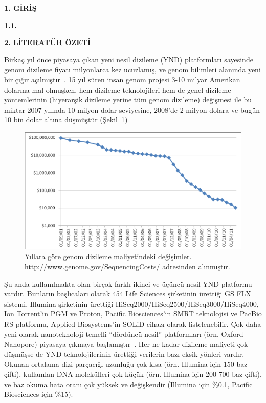 \documentclass[11pt]{article}
\begin{document}
\newpage
\begin{center}
{\bf \Large 1. GİRİŞ}
\end{center}

\bigskip
\noindent
{\bf \large 1.1. }

\noindent

\begin{center}
{\bf \Large 2. LİTERATÜR ÖZETİ}
\end{center}

Birkaç yıl önce piyasaya çıkan yeni nesil dizileme (YND) platformları sayesinde genom dizileme fiyatı milyonlarca kez ucuzlamış, ve genom bilimleri alanında yeni bir çığır açılmıştır~\cite{Mardis2008}. 15 yıl süren insan genom projesi 3-10 milyar Amerikan dolarına mal olmuşken, hem dizileme teknolojileri hem de genel dizileme yöntemlerinin (hiyerarşik dizileme yerine tüm genom dizileme) değişmesi ile bu miktar 2007 yılında 10 milyon dolar seviyesine, 2008'de 2 milyon dolara ve bugün 10 bin dolar altına düşmüştür (Şekil~\ref{fig:cost})

\begin{figure}[htb]
\begin{center}
  \includegraphics[scale=0.75]{cost.png}
\end{center}
\caption{Yıllara göre genom dizileme maliyetindeki değişimler. http://www.genome.gov/SequencingCosts/ adresinden alınmıştır.}
\label{fig:cost}
\end{figure}


Şu anda kullanılmakta olan birçok farklı ikinci ve üçüncü nesil YND platformu vardır. Bunların başlıcaları olarak 454 Life Sciences şirketinin ürettiği GS FLX sistemi, Illumina şirketinin ürettiği HiSeq2000/HiSeq2500/HiSeq3000/HiSeq4000, Ion Torrent'in PGM ve Proton, Pacific Biosciences'in SMRT teknolojisi ve PacBio RS platformu, Applied Biosystems'in SOLiD cihazı olarak listelenebilir. Çok daha yeni olarak nanoteknoloji temelli ``dördüncü nesil'' platformları (örn. Oxford Nanopore) piyasaya çıkmaya başlamıştır~\cite{Metzker2010,Loman2015}. Her ne kadar dizileme maliyeti çok düşmüşse de YND teknolojilerinin ürettiği verilerin bazı eksik yönleri vardır. Okunan ortalama dizi parçacığı uzunluğu çok kısa (örn. Illumina için 150 baz çifti), kullanılan DNA molekülleri çok küçük (örn. Illumina için 200-700 baz çifti), ve baz okuma hata oranı çok yüksek ve değişkendir (Illumina için \%0.1, Pacific Biosciences için \%15).
\end{document}
